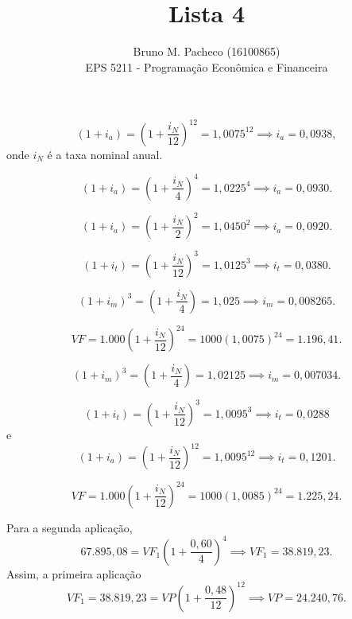 \documentclass[a4paper]{report}
\begin{document}
 
\title{Lista 4}
\author{Bruno M. Pacheco (16100865)\\
EPS 5211 - Programação Econômica e Financeira}
 
\maketitle
 


\[
\left( 1 + i_a \right) = \left( 1 + \frac{i_N}{12} \right)^{12} = 1,0075^{12} \implies i_a = 0,0938
,\] onde $i_N$ é a taxa nominal anual.


\[
\left( 1 + i_a \right) = \left( 1 + \frac{i_N}{4} \right)^{4} = 1,0225^{4} \implies i_a = 0,0930
.\] 


\[
\left( 1 + i_a \right) = \left( 1 + \frac{i_N}{2} \right)^{2} = 1,0450^{2} \implies i_a = 0,0920
.\] 


\[
\left( 1 + i_t \right) = \left( 1 + \frac{i_N}{12} \right)^{3} = 1,0125^{3} \implies i_t = 0,0380
.\] 


\[
\left( 1 + i_m \right)^{3} = \left( 1 + \frac{i_N}{4} \right) = 1,025 \implies i_m = 0,008265
.\] 


\[
VF = 1.000 \left( 1 + \frac{i_N}{12}  \right) ^{24} = 1000 \left( 1,0075 \right) ^{24} = 1.196,41
.\] 


\[
\left( 1 + i_m \right)^{3} = \left( 1 + \frac{i_N}{4} \right) = 1,02125 \implies i_m = 0,007034
.\] 


\[
\left( 1 + i_t \right) = \left( 1 + \frac{i_N}{12} \right)^{3} = 1,0095^{3} \implies i_t = 0,0288
\] e \[
\left( 1 + i_a \right) = \left( 1 + \frac{i_N}{12} \right)^{12} = 1,0095^{12} \implies i_t = 0,1201
.\] 


\[
VF = 1.000 \left( 1 + \frac{i_N}{12}  \right) ^{24} = 1000 \left( 1,0085 \right) ^{24} = 1.225,24
.\] 


Para a segunda aplicação, \[
67.895,08 = VF_1 \left( 1 + \frac{0,60}{4} \right)^{4} \implies VF_1 = 38.819,23
.\] Assim, a primeira aplicação \[
VF_1 = 38.819,23 = VP \left( 1 + \frac{0,48}{12} \right) ^{12} \implies VP = 24.240,76
.\] 
\end{document}
